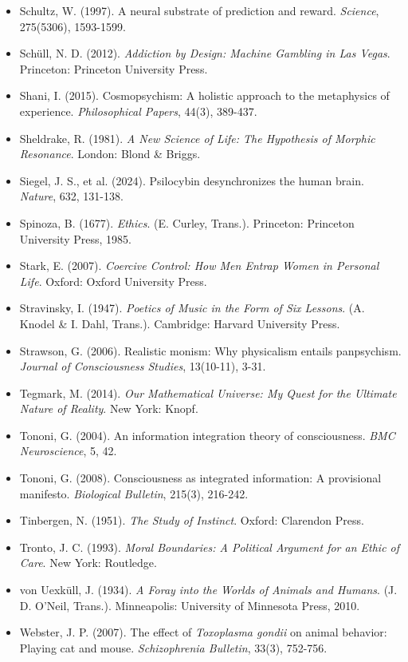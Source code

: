 \begin{itemize}[nosep,leftmargin=*]
  \item Schultz, W. (1997). A neural substrate of prediction and reward. \textit{Science}, 275(5306), 1593-1599.
  \item Schüll, N. D. (2012). \textit{Addiction by Design: Machine Gambling in Las Vegas}. Princeton: Princeton University Press.
  \item Shani, I. (2015). Cosmopsychism: A holistic approach to the metaphysics of experience. \textit{Philosophical Papers}, 44(3), 389-437.
  \item Sheldrake, R. (1981). \textit{A New Science of Life: The Hypothesis of Morphic Resonance}. London: Blond \& Briggs.
  \item Siegel, J. S., et al. (2024). Psilocybin desynchronizes the human brain. \textit{Nature}, 632, 131-138.
  \item Spinoza, B. (1677). \textit{Ethics}. (E. Curley, Trans.). Princeton: Princeton University Press, 1985.
  \item Stark, E. (2007). \textit{Coercive Control: How Men Entrap Women in Personal Life}. Oxford: Oxford University Press.
  \item Stravinsky, I. (1947). \textit{Poetics of Music in the Form of Six Lessons}. (A. Knodel \& I. Dahl, Trans.). Cambridge: Harvard University Press.
  \item Strawson, G. (2006). Realistic monism: Why physicalism entails panpsychism. \textit{Journal of Consciousness Studies}, 13(10-11), 3-31.
  \item Tegmark, M. (2014). \textit{Our Mathematical Universe: My Quest for the Ultimate Nature of Reality}. New York: Knopf.
  \item Tononi, G. (2004). An information integration theory of consciousness. \textit{BMC Neuroscience}, 5, 42.
  \item Tononi, G. (2008). Consciousness as integrated information: A provisional manifesto. \textit{Biological Bulletin}, 215(3), 216-242.
  \item Tinbergen, N. (1951). \textit{The Study of Instinct}. Oxford: Clarendon Press.
  \item Tronto, J. C. (1993). \textit{Moral Boundaries: A Political Argument for an Ethic of Care}. New York: Routledge.
  \item von Uexküll, J. (1934). \textit{A Foray into the Worlds of Animals and Humans}. (J. D. O'Neil, Trans.). Minneapolis: University of Minnesota Press, 2010.
  \item Webster, J. P. (2007). The effect of \textit{Toxoplasma gondii} on animal behavior: Playing cat and mouse. \textit{Schizophrenia Bulletin}, 33(3), 752-756.

\end{itemize}
